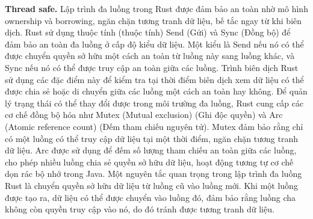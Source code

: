 \textbf{Thread safe.} Lập trình đa luồng trong Rust được đảm bảo an toàn nhờ mô hình ownership và borrowing, ngăn chặn tương tranh dữ liệu, bế tắc ngay từ khi biên dịch.
Rust sử dụng thuộc tính (thuộc tính) Send (Gửi) và Sync (Đồng bộ) để đảm bảo an toàn đa luồng ở cấp độ kiểu dữ liệu.
Một kiểu là Send nếu nó có thể được chuyển quyền sở hữu một cách an toàn từ luồng này sang luồng khác, và Sync nếu nó có thể được truy cập an toàn giữa các luồng.
Trình biên dịch Rust sử dụng các đặc điểm này để kiểm tra tại thời điểm biên dịch xem dữ liệu có thể được chia sẻ hoặc di chuyển giữa các luồng một cách an toàn hay không.
Để quản lý trạng thái có thể thay đổi được trong môi trường đa luồng, Rust cung cấp các cơ chế đồng bộ hóa như Mutex (Mutual exclusion) (Ghi độc quyền) và Arc (Atomic reference count) (Đếm tham chiếu nguyên tử).
Mutex đảm bảo rằng chỉ có một luồng có thể truy cập dữ liệu tại một thời điểm, ngăn chặn tương tranh dữ liệu.
Arc được sử dụng để đếm số lượng tham chiếu an toàn giữa các luồng, cho phép nhiều luồng chia sẻ quyền sở hữu dữ liệu, hoạt động tương tự cơ chế dọn rác bộ nhớ trong Java.
Một nguyên tắc quan trọng trong lập trình đa luồng Rust là chuyển quyền sở hữu dữ liệu từ luồng cũ vào luồng mới.
Khi một luồng được tạo ra, dữ liệu có thể được chuyển vào luồng đó, đảm bảo rằng luồng cha không còn quyền truy cập vào nó, do đó tránh được tương tranh dữ liệu.


